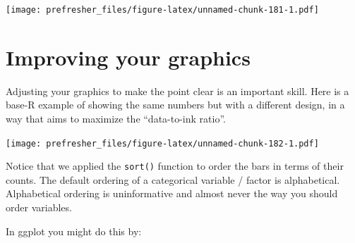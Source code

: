 \documentclass[]{book}
\newenvironment{Shaded}{\begin{snugshade}}{\end{snugshade}}
\newcommand{\CommentTok}[1]{\textcolor[rgb]{0.56,0.35,0.01}{\textit{#1}}}
\newcommand{\DataTypeTok}[1]{\textcolor[rgb]{0.13,0.29,0.53}{#1}}
\newcommand{\DecValTok}[1]{\textcolor[rgb]{0.00,0.00,0.81}{#1}}
\newcommand{\KeywordTok}[1]{\textcolor[rgb]{0.13,0.29,0.53}{\textbf{#1}}}
\newcommand{\NormalTok}[1]{#1}
\newcommand{\OperatorTok}[1]{\textcolor[rgb]{0.81,0.36,0.00}{\textbf{#1}}}
\newcommand{\OtherTok}[1]{\textcolor[rgb]{0.56,0.35,0.01}{#1}}
\newcommand{\StringTok}[1]{\textcolor[rgb]{0.31,0.60,0.02}{#1}}
\theoremstyle{definition}
\theoremstyle{definition}
\theoremstyle{definition}
\theoremstyle{remark}
\begin{document}
\texttt{[image: prefresher\_files/figure-latex/unnamed-chunk-181-1.pdf]}

\hypertarget{improving-your-graphics}{%
\section{Improving your graphics}\label{improving-your-graphics}}

Adjusting your graphics to make the point clear is an important skill. Here is a base-R example of showing the same numbers but with a different design, in a way that aims to maximize the ``data-to-ink ratio''.

\begin{Shaded}
\end{Shaded}

\texttt{[image: prefresher\_files/figure-latex/unnamed-chunk-182-1.pdf]}

Notice that we applied the \texttt{sort()} function to order the bars in terms of their counts. The default ordering of a categorical variable / factor is alphabetical. Alphabetical ordering is uninformative and almost never the way you should order variables.

In ggplot you might do this by:
\end{document}
